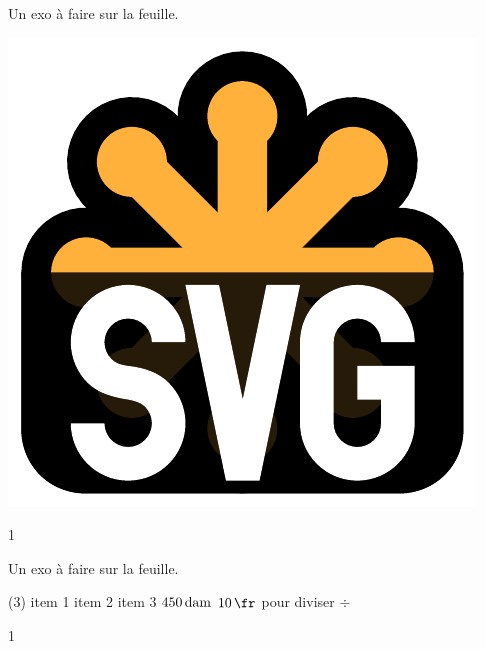 \documentclass[a4paper,11pt]{report}
\begin{document}
\begin{exo}{
Un exo à faire sur la feuille.
\begin{center}
\includegraphics[scale=0.5]{media/serieType/test.pdf}
\end{center}
}{1}
\end{exo}

\begin{exop}{
Un exo à faire sur la feuille.
\begin{tasks}(3)
	\task item 1
	\task item 2
	\task item 3
	\task $\tunit{450}{\deca m}$
	\task $\tunit{10}{\fr}$
	\task pour diviser $\div$
\end{tasks}
}{1}
\end{exop}
\end{document}
